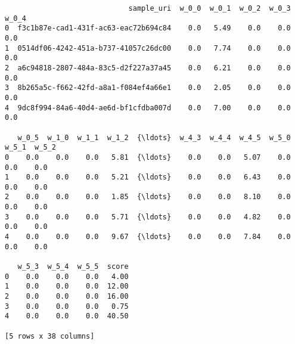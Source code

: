 






\begin{verbatim}
                             sample_uri  w_0_0  w_0_1  w_0_2  w_0_3  w_0_4  
0  f3c1b87e-cad1-431f-ac63-eac72b694c84    0.0   5.49    0.0    0.0    0.0
1  0514df06-4242-451a-b737-41057c26dc00    0.0   7.74    0.0    0.0    0.0
2  a6c94818-2807-484a-83c5-d2f227a37a45    0.0   6.21    0.0    0.0    0.0
3  8b265a5c-f662-42fd-a8a1-f084ef4a66e1    0.0   2.05    0.0    0.0    0.0
4  9dc8f994-84a6-40d4-ae6d-bf1cfdba007d    0.0   7.00    0.0    0.0    0.0

   w_0_5  w_1_0  w_1_1  w_1_2  {\ldots}  w_4_3  w_4_4  w_4_5  w_5_0  w_5_1  w_5_2
0    0.0    0.0    0.0   5.81  {\ldots}    0.0    0.0   5.07    0.0    0.0    0.0
1    0.0    0.0    0.0   5.21  {\ldots}    0.0    0.0   6.43    0.0    0.0    0.0
2    0.0    0.0    0.0   1.85  {\ldots}    0.0    0.0   8.10    0.0    0.0    0.0
3    0.0    0.0    0.0   5.71  {\ldots}    0.0    0.0   4.82    0.0    0.0    0.0
4    0.0    0.0    0.0   9.67  {\ldots}    0.0    0.0   7.84    0.0    0.0    0.0

   w_5_3  w_5_4  w_5_5  score
0    0.0    0.0    0.0   4.00
1    0.0    0.0    0.0  12.00
2    0.0    0.0    0.0  16.00
3    0.0    0.0    0.0   0.75
4    0.0    0.0    0.0  40.50

[5 rows x 38 columns]
    \end{verbatim}

